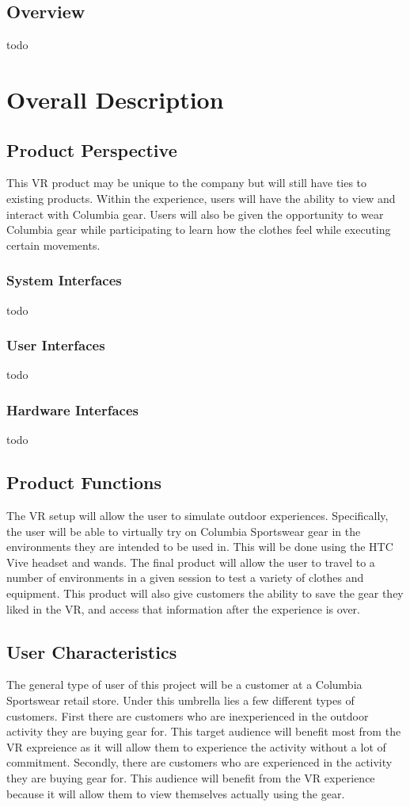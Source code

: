 \documentclass[10pt, oneside,onecolumn,draftclsnofoot]{IEEEtran}
\begin{document}
\subsection{Overview}
todo

\section{Overall Description}
\subsection{Product Perspective}
This VR product may be unique to the company but will still have ties to
existing products. Within the experience, users will have the ability to view
and interact with Columbia gear. Users will also be given the opportunity to
wear Columbia gear while participating to learn how the clothes feel while
executing certain movements.

\subsubsection{System Interfaces}
todo
\subsubsection{User Interfaces}
todo
\subsubsection{Hardware Interfaces}
todo

\subsection{Product Functions}
The VR setup will allow the user to simulate outdoor experiences.
Specifically, the user will be able to virtually try on Columbia Sportswear
gear in the environments they are intended to be used in.
This will be done using the HTC Vive headset and wands. The final product
will allow the user to travel to a number of environments in a given session to
test a variety of clothes and equipment. This product will also give customers
the ability to save the gear they liked in the VR, and access that information after the experience is over.

\subsection{User Characteristics}
The general type of user of this project will be a customer at a Columbia
Sportswear retail store. Under this umbrella lies a few different types of
customers. First there are customers who are inexperienced in the outdoor
activity they are buying gear for. This target audience will benefit most
from the VR expreience as it will allow them to experience the activity without a lot of commitment.
Secondly, there are customers who are
experienced in the activity they are buying gear for. This audience will
benefit from the VR experience because it will allow them to view themselves
actually using the gear.
\end{document}
